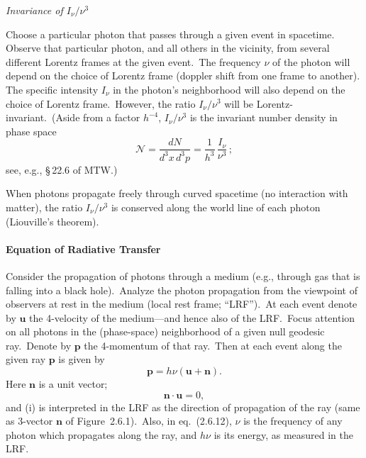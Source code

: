 

\textit{Invariance of $I_\nu/\nu^3$}

Choose a particular photon that passes through a given event in spacetime.
Observe that particular photon, and all others in the vicinity, from several different
Lorentz frames at the given event.\ The frequency $\nu$ of the photon will depend
on the choice of Lorentz frame (doppler shift from one frame to another).
The specific intensity $I_\nu$ in the photon's neighborhood will also depend
on the choice of Lorentz frame.\ However, the ratio $I_\nu/\nu^3$ will be Lorentz-invariant.\ (Aside from a factor $h^{-4}$, $I_\nu/\nu^3$ is the invariant number density in
phase space
%
\begin{equation}
\mathscr{N} = \frac{dN}{d^3 x\,d^3 p}
  = \frac{1}{h^3}\,\frac{I_\nu}{\nu^3}\,;
\tag{2.6.11}
\end{equation}
%
see, e.g., \S\,22.6 of MTW.)

When photons propagate freely through curved spacetime (no interaction with
matter), the ratio $I_\nu/\nu^3$ is conserved along the world line of each photon
(Liouville's theorem).


\paragraph*{Equation of Radiative Transfer}

Consider the propagation of photons through a medium (e.g., through gas that
is falling into a black hole).\ Analyze the photon propagation from the viewpoint
of observers at rest in the medium (local rest frame; ``LRF'').\ At each event
denote by $\mathbf{u}$ the 4-velocity of the medium---and hence also of the LRF.\ Focus
attention on all photons in the (phase-space) neighborhood of a given null
geodesic ray.\ Denote by $\mathbf{p}$ the 4-momentum of that ray.\ Then at each event
along the given ray $\mathbf{p}$ is given by
%
\begin{equation}
\mathbf{p} = h\nu(\mathbf{u} + \mathbf{n}).
\tag{2.6.12}
\end{equation}
%
Here $\mathbf{n}$ is a unit vector;
%
\[
\mathbf{n} \cdot \mathbf{u} = 0,
\]
%
and (i) is interpreted in the LRF as the direction of propagation of the ray
(same as 3-vector $\mathbf{n}$ of Figure~2.6.1).\ Also, in eq.~(2.6.12), $\nu$ is the frequency of
any photon which propagates along the ray, and $h\nu$ is its energy, as measured in
the LRF.


